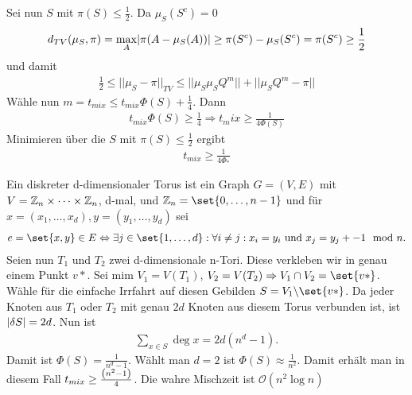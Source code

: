 \begin{beweis}
	Sei nun $S$ mit $\pi(S)\leq \frac{1}{2}$. Da $\mu_S(S^c) = 0$
	\begin{align}
		d_{TV}(\mu_S,\pi) = \max\limits_A \lvert\pi(A - \mu_S(A))\rvert \geq \pi(S^c)- \mu_S(S^c) = \pi(S^c) \geq \frac{1}{2}
 	\end{align}
 	und damit
 	\begin{align}
 		\frac{1}{2} \leq || \mu_S - \pi ||_{TV} \leq || \mu_S \mu_SQ^m || + || \mu_SQ^m-\pi ||
  	\end{align}
  	Wähle nun $m = t_{mix} \leq t_{mix}\Phi(S) + \frac{1}{4}$. Dann
  	\begin{align}
  		t_{mix} \Phi(S) \geq \frac{1}{4} \Rightarrow t_mix \geq \frac{1}{4\Phi(S)}
  	\end{align}
  	Minimieren über die $S$ mit $\pi(S) \leq \frac{1}{2}$ ergibt 
  	\begin{align}
  		t_{mix} \geq \frac{1}{4\Phi_*}
  	\end{align}
\end{beweis}

\begin{beispiel}
	Ein diskreter d-dimensionaler Torus ist ein Graph $G = (V,E)$ mit $V = \mathbb{Z}_n \times \dots \times \mathbb{Z}_n$, d-mal, und $\ZZ_n = \set{0,\dots,n-1}$ und für $x = (x_1,\dots,x_d), y = (y_1,\dots,y_d)$ sei 
	\begin{align}
		e = \set{x,y} \in E \Leftrightarrow \exists j \in \set{1,\dots,d} :\forall i \neq j: x_i = y_i  \text{ und } x_j = y_j +- 1 \mod{n}.
	\end{align} 
	Seien nun $T_1$ und $T_2$ zwei d-dimensionale n-Tori. Diese verkleben wir in genau einem Punkt $v*$. Sei mim $V_1 = V(T_1)$, $V_2 = V(T_2) \Rightarrow V_1 \cap V_2 = \set{v*}$. Wähle für die einfache Irrfahrt auf diesen Gebilden $S = V_1\backslash \set{v*}$. Da jeder Knoten aus $T_1$ oder $T_2$ mit genau $2d$ Knoten aus diesem Torus verbunden ist, ist $\lvert\delta S\rvert = 2d$. Nun ist 
	\begin{align}
		\sum\limits_{x \in S} \deg{x} = 2d(n^d-1). 
	\end{align}
	Damit ist $\Phi(S) = \frac{1}{n^d - 1}$. Wählt man $d = 2$ ist $\Phi(S) \approx \frac{1}{n^2}$. Damit erhält man in diesem Fall $t_{mix} \geq \frac{\left(n^2-1\right)}{4}$. Die wahre Mischzeit ist $\mathcal{O}(n^2 \log n)$
\end{beispiel}

